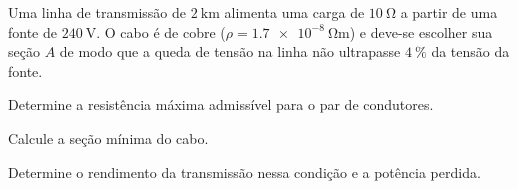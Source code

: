 \begin{questao}[3]{}

Uma linha de transmissão de $\SI{2}{\kilo\meter}$ alimenta uma carga de
$\SI{10}{\ohm}$ a partir de uma fonte de $\SI{240}{\volt}$. O cabo é de cobre
($\rho=\SI{1.7e-8}{\ohm\meter}$) e deve-se escolher sua seção $A$ de modo que a
queda de tensão na linha não ultrapasse $\SI{4}{\percent}$ da tensão da fonte.
\begin{itensq}
\item Determine a resistência máxima admissível para o par de condutores.
\item Calcule a seção mínima do cabo.
\item Determine o rendimento da transmissão nessa condição e a potência perdida.
\end{itensq}


\end{questao}

